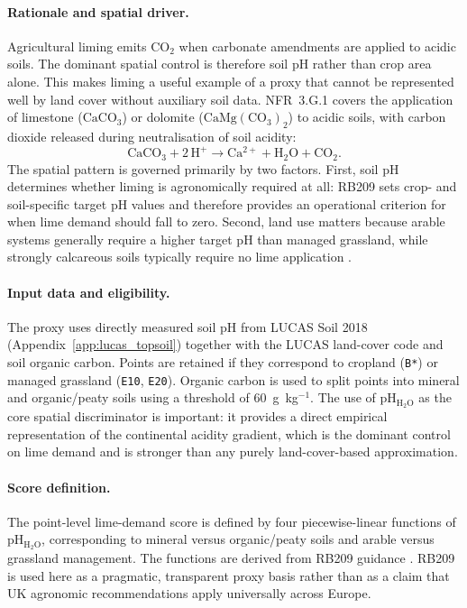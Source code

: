 \paragraph{Rationale and spatial driver.}
Agricultural liming emits CO$_2$ when carbonate amendments are applied
to acidic soils. The dominant spatial control is therefore soil pH
rather than crop area alone. This makes liming a useful example of a
proxy that cannot be represented well by land cover without auxiliary
soil data. NFR~3.G.1 covers the application of limestone
(\(\mathrm{CaCO_3}\)) or dolomite (\(\mathrm{CaMg(CO_3)_2}\)) to acidic
soils, with carbon dioxide released during neutralisation of soil
acidity:
\begin{equation}
  \mathrm{CaCO_3 + 2\,H^+ \rightarrow Ca^{2+} + H_2O + CO_2}.
\end{equation}
The spatial pattern is governed primarily by two factors. First, soil
pH determines whether liming is agronomically required at all: RB209
\citep{RB209} sets crop- and soil-specific target pH values and
therefore provides an operational criterion for when lime demand should
fall to zero. Second, land use matters because arable systems generally
require a higher target pH than managed grassland, while strongly
calcareous soils typically require no lime application
\citep{goulding2016,RB209}.

\paragraph{Input data and eligibility.}
The proxy uses directly measured soil pH from LUCAS Soil 2018
(Appendix~\ref{app:lucas_topsoil}) together with the LUCAS land-cover
code and soil organic carbon. Points are retained if they correspond to
cropland (\texttt{B*}) or managed grassland (\texttt{E10}, \texttt{E20}).
Organic carbon is used to split points into mineral and organic/peaty
soils using a threshold of 60~g~kg$^{-1}$. The use of
\(\mathrm{pH_{H_2O}}\) as the core spatial discriminator is important:
it provides a direct empirical representation of the continental
acidity gradient, which is the dominant control on lime demand and is
stronger than any purely land-cover-based approximation.

\paragraph{Score definition.}
The point-level lime-demand score is defined by four piecewise-linear
functions of $\mathrm{pH_{H_2O}}$, corresponding to mineral versus
organic/peaty soils and arable versus grassland management. The
functions are derived from RB209 guidance
\citep{RB209,goulding2016}. RB209 is used here as a pragmatic,
transparent proxy basis rather than as a claim that UK agronomic
recommendations apply universally across Europe.

